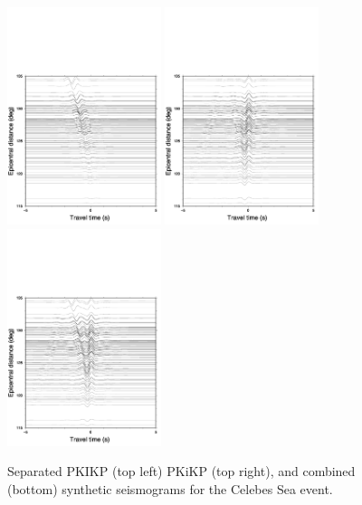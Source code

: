 \documentclass[11pt,a4paper]{article}
\begin{document}
\begin{figure}
	\centering
	\includegraphics[width=0.4\textwidth]{figures/celebessea/celebessea_KIK_aligned}
	\includegraphics[width=0.4\textwidth]{figures/celebessea/celebessea_pkikp_aligned}
	\includegraphics[width=0.4\textwidth]{figures/celebessea/celebessea_both_aligned}
	\caption{Separated PKIKP (top left) PKiKP (top right), and combined (bottom) synthetic seismograms for the Celebes Sea event.}
	\label{fig:Synth aligned}
\end{figure}
\end{document}
